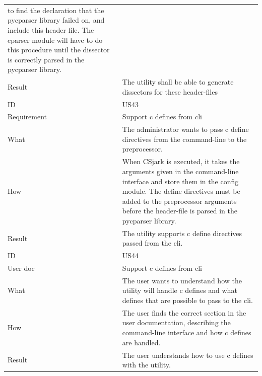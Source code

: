 \begin{table}[htbp]
{\begin{tabularx}{1.2\textwidth}{l X}
	to find the declaration that the \gls{pycparser} \gls{library} failed on, and include this \gls{header} file. The cparser module will have to do this procedure until the \gls{dissector} is correctly parsed in the \gls{pycparser} \gls{library}. \\
	Result & The \gls{utility} shall be able to generate \glspl{dissector} for these \gls{header}-files \\	
	\midrule
	ID & US43 \\
	Requirement & Support \Gls{c} \glspl{define} from \gls{cli}  \\
	What & The administrator wants to pass \Gls{c} \gls{define} directives from the command-line to the \gls{preprocessor}.   \\
	How & When CSjark is executed, it takes the arguments given in the command-line interface and store them in the config module.
	The \gls{define} directives must be added to the \gls{preprocessor} arguments before the \gls{header}-file is parsed in the \gls{pycparser} \gls{library}.   \\
	Result & The \gls{utility} supports \Gls{c} \gls{define} directives passed from the \gls{cli}. \\
	\midrule
	ID & US44 \\
	User doc & Support \Gls{c} \glspl{define} from \gls{cli} \\
	What & The user wants to understand how the \gls{utility} will handle \Gls{c} \glspl{define} and what \glspl{define} that are possible to pass to the \gls{cli}.   \\
	How & The user finds the correct section in the user documentation, describing the command-line interface and how \Gls{c} \glspl{define} are handled.  \\
	Result & The user understands how to use \Gls{c} \glspl{define} with the \gls{utility}. \\
	\bottomrule
\end{tabularx}}
\end{table}


